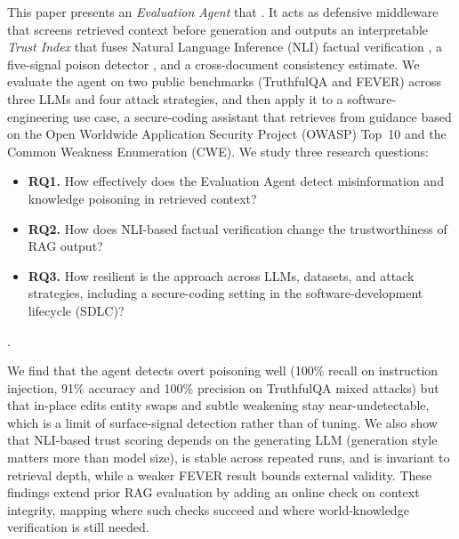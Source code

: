 This paper presents an \emph{Evaluation Agent} that . It acts as defensive middleware that screens retrieved context before generation and outputs an interpretable \emph{Trust Index} that fuses Natural Language Inference (NLI) factual verification \cite{maynez2020faithfulness}\cite{honovich2022true}, a five-signal poison detector , and a cross-document consistency estimate. We evaluate the agent on two public benchmarks (TruthfulQA and FEVER) across three LLMs and four attack strategies, and then apply it to a software-engineering use case, a secure-coding assistant that retrieves from guidance based on the Open Worldwide Application Security Project (OWASP) Top~10 and the Common Weakness Enumeration (CWE). We study three research questions:
\begin{itemize}
  \item \textbf{RQ1.} How effectively does the Evaluation Agent detect misinformation and knowledge poisoning in retrieved context?
  \item \textbf{RQ2.} How does NLI-based factual verification change the trustworthiness of RAG output?
  \item \textbf{RQ3.} How resilient is the approach across LLMs, datasets, and attack strategies, including a secure-coding setting in the software-development lifecycle (SDLC)?
\end{itemize}
 \cite{repoartifacts}.

We find that the agent detects overt poisoning well (100\% recall on instruction injection, 91\% accuracy and 100\% precision on TruthfulQA mixed attacks) but that in-place edits entity swaps and subtle weakening\rev{,} stay near-undetectable, which is a limit of surface-signal detection rather than of tuning. We also show that NLI-based trust scoring depends on the generating LLM (generation style matters more than model size), is stable across repeated runs, and is invariant to retrieval depth, while a weaker FEVER result bounds external validity. These findings extend prior RAG evaluation by adding an online check on context integrity, mapping where such checks succeed and where world-knowledge verification is still needed.

